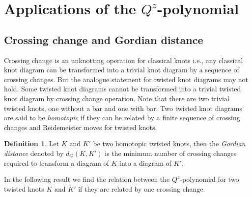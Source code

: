 \documentclass[10pt,a4paper,reqno]{amsart}
\theoremstyle{definition}
\newtheorem{definition}{Definition}[section]
\theoremstyle{remark}
\begin{document}
\section{Applications of the \texorpdfstring{$Q^{z}$}{Qz}-polynomial}\label{sec:applications}
\subsection{Crossing change and Gordian distance}
Crossing change is an unknotting operation for classical knots i.e., any classical knot diagram can be transformed into a trivial knot diagram by a sequence of crossing changes. But the analogue statement for twisted knot diagrams may not hold. Some twisted knot diagrams cannot be transformed into a trivial twisted knot diagram by crossing change operation. Note that there are two trivial twisted knots, one without a bar and one with bar. Two twisted knot diagrams are said to be \textit{homotopic} if they can be related by a finite sequence of crossing changes and Reidemeister moves for twisted knots.


\begin{definition}
	Let $K$ and $K'$ be two homotopic twisted knots, then the {\it Gordian distance} denoted by $d_{G}(K,K')$ is the minimum number of crossing changes required to transform  a diagram of $K$ into a diagram of $K'$. 
\end{definition}

  In the following result we find the relation between the $Q^{z}$-polynomial for two twisted knots $K$ and $K'$ if they are related by one crossing change.
\end{document}
